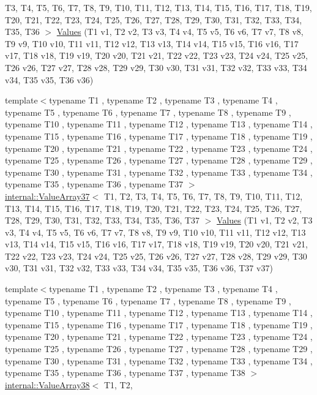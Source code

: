 \begin{DoxyCompactItemize}
\-T3, \-T4, \-T5, \-T6, \-T7, \-T8, \-T9, \*
\-T10, \-T11, \-T12, \-T13, \-T14, \-T15, \*
\-T16, \-T17, \-T18, \-T19, \-T20, \-T21, \*
\-T22, \-T23, \-T24, \-T25, \-T26, \-T27, \*
\-T28, \-T29, \-T30, \-T31, \-T32, \-T33, \*
\-T34, \-T35, \-T36 $>$ \hyperlink{namespacetesting_ae5d25537f4919c9e82d02c45af4c7c5f}{\-Values} (\-T1 v1, \-T2 v2, \-T3 v3, \-T4 v4, \-T5 v5, \-T6 v6, \-T7 v7, \-T8 v8, \-T9 v9, \-T10 v10, \-T11 v11, \-T12 v12, \-T13 v13, \-T14 v14, \-T15 v15, \-T16 v16, \-T17 v17, \-T18 v18, \-T19 v19, \-T20 v20, \-T21 v21, \-T22 v22, \-T23 v23, \-T24 v24, \-T25 v25, \-T26 v26, \-T27 v27, \-T28 v28, \-T29 v29, \-T30 v30, \-T31 v31, \-T32 v32, \-T33 v33, \-T34 v34, \-T35 v35, \-T36 v36)
\item 
{\footnotesize template$<$typename T1 , typename T2 , typename T3 , typename T4 , typename T5 , typename T6 , typename T7 , typename T8 , typename T9 , typename T10 , typename T11 , typename T12 , typename T13 , typename T14 , typename T15 , typename T16 , typename T17 , typename T18 , typename T19 , typename T20 , typename T21 , typename T22 , typename T23 , typename T24 , typename T25 , typename T26 , typename T27 , typename T28 , typename T29 , typename T30 , typename T31 , typename T32 , typename T33 , typename T34 , typename T35 , typename T36 , typename T37 $>$ }\\\hyperlink{classtesting_1_1internal_1_1ValueArray37}{internal\-::\-Value\-Array37}$<$ \-T1, \-T2, \*
\-T3, \-T4, \-T5, \-T6, \-T7, \-T8, \-T9, \*
\-T10, \-T11, \-T12, \-T13, \-T14, \-T15, \*
\-T16, \-T17, \-T18, \-T19, \-T20, \-T21, \*
\-T22, \-T23, \-T24, \-T25, \-T26, \-T27, \*
\-T28, \-T29, \-T30, \-T31, \-T32, \-T33, \*
\-T34, \-T35, \-T36, \-T37 $>$ \hyperlink{namespacetesting_aa800bbbe42a44b1776cfd61c9e337ab6}{\-Values} (\-T1 v1, \-T2 v2, \-T3 v3, \-T4 v4, \-T5 v5, \-T6 v6, \-T7 v7, \-T8 v8, \-T9 v9, \-T10 v10, \-T11 v11, \-T12 v12, \-T13 v13, \-T14 v14, \-T15 v15, \-T16 v16, \-T17 v17, \-T18 v18, \-T19 v19, \-T20 v20, \-T21 v21, \-T22 v22, \-T23 v23, \-T24 v24, \-T25 v25, \-T26 v26, \-T27 v27, \-T28 v28, \-T29 v29, \-T30 v30, \-T31 v31, \-T32 v32, \-T33 v33, \-T34 v34, \-T35 v35, \-T36 v36, \-T37 v37)
\item 
{\footnotesize template$<$typename T1 , typename T2 , typename T3 , typename T4 , typename T5 , typename T6 , typename T7 , typename T8 , typename T9 , typename T10 , typename T11 , typename T12 , typename T13 , typename T14 , typename T15 , typename T16 , typename T17 , typename T18 , typename T19 , typename T20 , typename T21 , typename T22 , typename T23 , typename T24 , typename T25 , typename T26 , typename T27 , typename T28 , typename T29 , typename T30 , typename T31 , typename T32 , typename T33 , typename T34 , typename T35 , typename T36 , typename T37 , typename T38 $>$ }\\\hyperlink{classtesting_1_1internal_1_1ValueArray38}{internal\-::\-Value\-Array38}$<$ \-T1, \-T2, \*

\end{DoxyCompactItemize}
